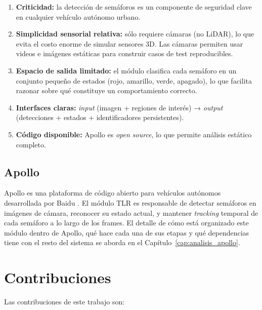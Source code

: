 \begin{enumerate}
    \item \textbf{Criticidad:} la detección de semáforos es un componente de seguridad clave en cualquier vehículo autónomo urbano.

    \item \textbf{Simplicidad sensorial relativa:} sólo requiere cámaras (no LiDAR), lo que evita el costo enorme de simular sensores 3D. Las cámaras permiten usar videos e imágenes estáticas para construir casos de test reproducibles.

    \item \textbf{Espacio de salida limitado:} el módulo clasifica cada semáforo en un conjunto pequeño de estados (rojo, amarillo, verde, apagado), lo que facilita razonar sobre qué constituye un comportamiento correcto.

    \item \textbf{Interfaces claras:} \textit{input} (imagen + regiones de interés) → \textit{output} (detecciones + estados + identificadores persistentes).

    \item \textbf{Código disponible:} Apollo es \textit{open source}, lo que permite análisis estático completo.
\end{enumerate}

\subsection{Apollo}

Apollo es una plataforma de código abierto para vehículos autónomos desarrollada por Baidu \cite{apollo_auto}. El módulo TLR es responsable de detectar semáforos en imágenes de cámara, reconocer su estado actual, y mantener \textit{tracking} temporal de cada semáforo a lo largo de los frames. El detalle de cómo está organizado este módulo dentro de Apollo, qué hace cada una de sus etapas y qué dependencias tiene con el resto del sistema se aborda en el Capítulo~\ref{cap:analisis_apollo}.

\section{Contribuciones}

Las contribuciones de este trabajo son:

